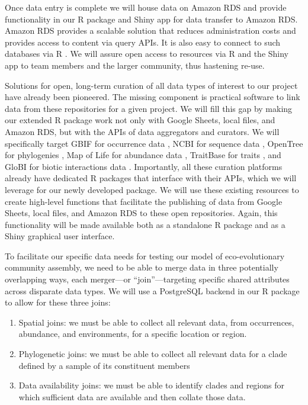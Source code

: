 \documentclass[11pt]{article}
\begin{document}
Once data entry is complete we will house data on Amazon RDS and
provide functionality in our R package and Shiny app for data transfer
to Amazon RDS. Amazon RDS provides a scalable solution that reduces
administration costs and provides access to content via query APIs. It
is also easy to connect to such databases via R
\cite{Wickham2015-cj}. We will assure open access to resources via R
and the Shiny app to team members and the larger community, thus
hastening re-use.

Solutions for open, long-term curation of all data types of interest to
our project have already been pioneered. The missing component is
practical software to link data from these repositories for a given
project. We will fill this gap by making our extended R package work not
only with Google Sheets, local files, and Amazon RDS, but with the APIs
of data aggregators and curators. We will specifically target GBIF for
occurrence data \cite{Flemons2007-eg}, NCBI for sequence data
\cite{Sherry2001-pn,Benson1993-jf}, OpenTree for phylogenies
\cite{Hinchliff2015-vi}, Map of Life for abundance data
\cite{Jetz2012-uq,Guralnick2017-xb}, TraitBase for traits
\cite{Bartomeus2018-zq}, and GloBI for biotic interactions data
\cite{Poelen2014-lg}. Importantly, all these curation platforms already
have dedicated R packages
\cite{Chamberlain2014-ds,Winter2017-ei,Michonneau2016-yc,Molina2017-hm,Poelen2018-vp}
that interface with their APIs, which we will leverage for our newly
developed package. We will use these existing resources to create
high-level functions that facilitate the publishing of data from Google
Sheets, local files, and Amazon RDS to these open repositories. Again,
this functionality will be made available both as a standalone R package
and as a Shiny graphical user interface.

To facilitate our specific data needs for testing our model of
eco-evolutionary community assembly, we need to be able to merge data
in three potentially overlapping ways, each merger---or
``join''---targeting specific shared attributes across disparate data
types. We will use a PostgreSQL \cite{Douglas2003-zs} backend in our R
package to allow for these three joins:

\begin{enumerate}
\def\labelenumi{\arabic{enumi}.}
\item
  Spatial joins: we must be able to collect all relevant data, from
  occurrences, abundance, and environments, for a specific location or
  region.
\item
  Phylogenetic joins: we must be able to collect all relevant data for a
  clade defined by a sample of its constituent members
\item
  Data availability joins: we must be able to identify clades and
  regions for which sufficient data are available and then collate those
  data.
\end{enumerate}
\end{document}
